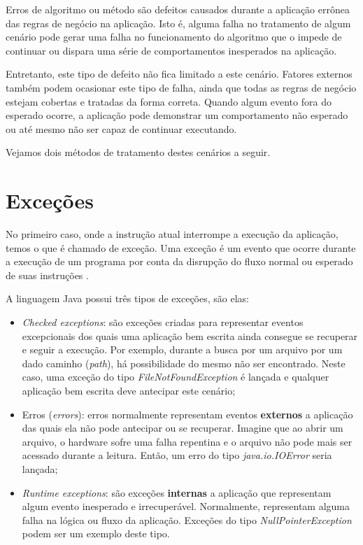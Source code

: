 Erros de algoritmo ou método são defeitos causados durante a aplicação errônea das regras de negócio na aplicação. Isto é, alguma falha no tratamento de algum cenário pode gerar uma falha no funcionamento do algoritmo que o impede de continuar ou dispara uma série de comportamentos inesperados na aplicação.

Entretanto, este tipo de defeito não fica limitado a este cenário. Fatores externos também podem ocasionar este tipo de falha, ainda que todas as regras de negócio estejam cobertas e tratadas da forma correta. Quando algum evento fora do esperado ocorre, a aplicação pode demonstrar um comportamento não esperado ou até mesmo não ser capaz de continuar executando.

Vejamos dois métodos de tratamento destes cenários a seguir.

\section{Exceções}

No primeiro caso, onde a instrução atual interrompe a execução da aplicação, temos o que é chamado de exceção. Uma exceção é um evento que ocorre durante a execução de um programa por conta da disrupção do fluxo normal ou esperado de suas instruções \cite{java_exception_definition}.

A linguagem Java possui três tipos de exceções, são elas:

\begin{itemize}
    \item \textit{Checked exceptions}: são exceções criadas para representar eventos excepcionais dos quais uma aplicação bem escrita ainda consegue se recuperar e seguir a execução. Por exemplo, durante a busca por um arquivo por um dado caminho (\textit{path}), há possibilidade do mesmo não ser encontrado. Neste caso, uma exceção do tipo \textit{FileNotFoundException} é lançada e qualquer aplicação bem escrita deve antecipar este cenário;
    \item Erros (\textit{errors}): erros normalmente representam eventos \textbf{externos} a aplicação das quais ela não pode antecipar ou se recuperar. Imagine que ao abrir um arquivo, o hardware sofre uma falha repentina e o arquivo não pode mais ser acessado durante a leitura. Então, um erro do tipo \textit{java.io.IOError} seria lançada;
    \item \textit{Runtime exceptions}: são exceções \textbf{internas} a aplicação que representam algum evento inesperado e irrecuperável. Normalmente, representam alguma falha na lógica ou fluxo da aplicação. Exceções do tipo \textit{NullPointerException} podem ser um exemplo deste tipo.
\end{itemize}

